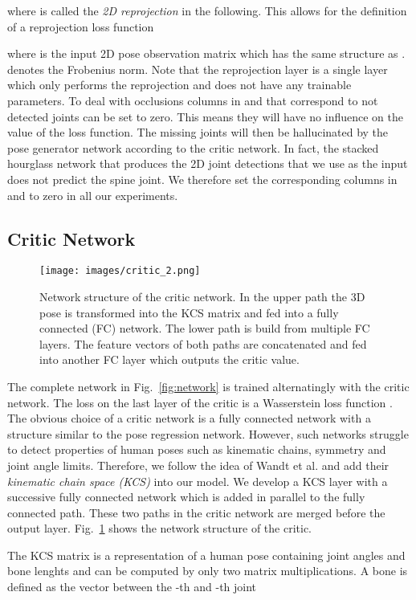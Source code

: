 \documentclass[10pt,twocolumn,letterpaper]{article}
\begin{document}
where  is called the \textit{2D reprojection} in the following.
This allows for the definition of a reprojection loss function

where  is the input 2D pose observation matrix which has the same structure as .
 denotes the Frobenius norm.
Note that the reprojection layer is a single layer which only performs the reprojection and does not have any trainable parameters.
To deal with occlusions columns in  and  that correspond to not detected joints can be set to zero.
This means they will have no influence on the value of the loss function.
The missing joints will then be hallucinated by the pose generator network according to the critic network.
In fact, the stacked hourglass network that produces the 2D joint detections \cite{StackedHourglassNewell2016} that we use as the input does not predict the spine joint.
We therefore set the corresponding columns in  and  to zero in all our experiments.

\subsection{Critic Network}
\begin{figure}[t!]
	\centering
	\texttt{[image: images/critic\_2.png]}
	\caption{Network structure of the critic network. In the upper path the 3D pose is transformed into the KCS matrix and fed into a fully connected (FC) network. The lower path is build from multiple FC layers. The feature vectors of both paths are concatenated and fed into another FC layer which outputs the critic value.}
	\label{fig:critic}
\end{figure}
The complete network in Fig.~\ref{fig:network} is trained alternatingly with the critic network. 
The loss on the last layer of the critic is a Wasserstein loss function \cite{wgan2017}. 
The obvious choice of a critic network is a fully connected network with a structure similar to the pose regression network.
However, such networks struggle to detect properties of human poses such as kinematic chains, symmetry and joint angle limits.
Therefore, we follow the idea of Wandt et al. \cite{WanAck2018a} and add their \textit{kinematic chain space (KCS)} into our model.
We develop a KCS layer with a successive fully connected network which is added in parallel to the fully connected path.
These two paths in the critic network are merged before the output layer.
Fig.~\ref{fig:critic} shows the network structure of the critic.

The KCS matrix is a representation of a human pose containing joint angles and bone lenghts and can be computed by only two matrix multiplications.
A bone  is defined as the vector between the -th and -th joint
\end{document}
